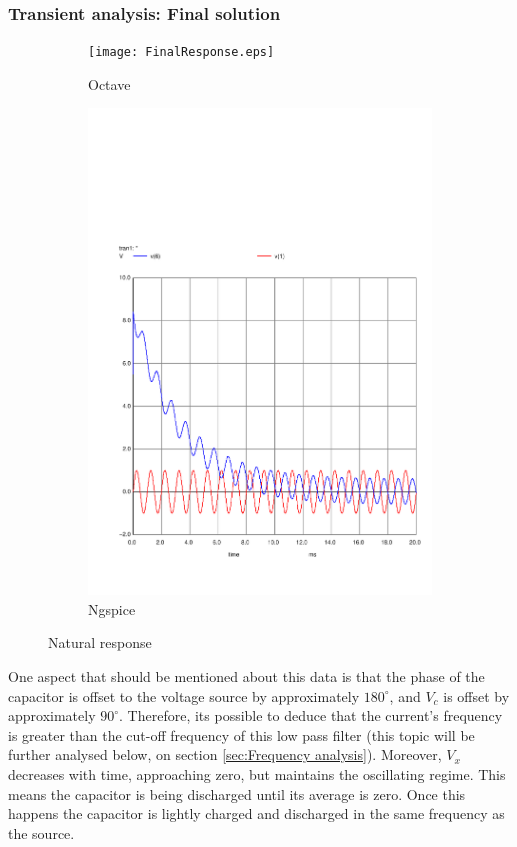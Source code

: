 \subsubsection{Transient analysis: Final solution}

\indent


\begin{figure}[H]
\centering
\begin{subfigure}{.5\textwidth}
  \centering
  \texttt{[image: FinalResponse.eps]}
  \caption{Octave}
\end{subfigure}%
\begin{subfigure}{.5\textwidth}
  \centering
  \includegraphics[width=.8\linewidth]{../Simulation/trans_forc.pdf}
  \caption{Ngspice}
\end{subfigure}
\caption{Natural response}
\label{fig:test}
\end{figure}



One aspect that should be mentioned about this data is that the phase of the capacitor is offset to the voltage source by approximately $180^\circ$, and $V_c$ is offset by approximately $90^\circ$. Therefore, its possible to deduce that the current's frequency is greater than the cut-off frequency of this low pass filter (this topic will be further analysed below, on section \ref{sec:Frequency analysis}).
Moreover, $V_x$ decreases with time, approaching zero, but maintains the oscillating regime. This means the capacitor is being discharged until its average is zero. Once this happens the capacitor is lightly charged and discharged in the same frequency as the source.


